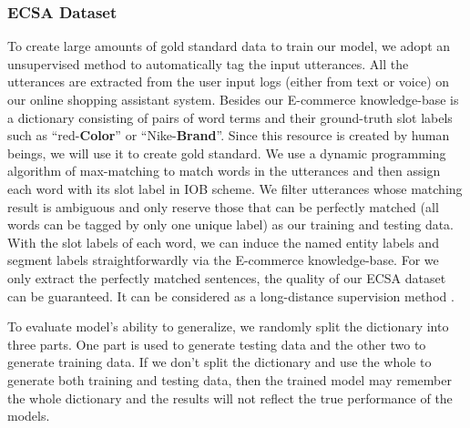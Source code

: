 \subsubsection{ECSA Dataset}
\label{sec:ECSGA_data}
To create large amounts of gold standard data 
to train our model,
we adopt an unsupervised method to 
automatically tag the input utterances.
All the utterances are extracted from the user input logs 
(either from text or voice) on our online shopping 
assistant system. Besides our E-commerce knowledge-base
is a dictionary consisting of pairs of
word terms and their ground-truth slot labels 
such as ``red-\textbf{Color}'' or ``Nike-\textbf{Brand}''.
Since this resource is created by human beings,
we will use it to create gold standard.
We use a dynamic programming algorithm of max-matching to 
match words in the utterances and then assign each word with 
its slot label in IOB scheme.
We filter utterances whose matching result is
ambiguous and only reserve those that can be 
perfectly matched
(all words can be tagged by only one unique label) 
as our training and testing data.
With the slot labels of each word, we can induce the 
named entity labels and segment labels straightforwardly via the E-commerce knowledge-base.
For we only extract the perfectly matched sentences,
the quality of our ECSA dataset can be guaranteed.
It can be considered as a long-distance supervision method \cite{mintz2009distant}.

To evaluate model's ability to generalize, 
we randomly split the dictionary into three parts.
One part is used to generate testing data and the other two 
to generate training data.
If we don't split the dictionary and use the whole to generate 
both training and testing data,
then the trained model may remember the whole dictionary and 
the results will not reflect the true performance of the models.

